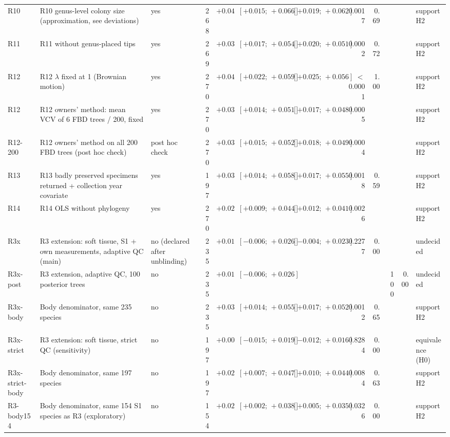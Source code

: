 \begin{table}
\begin{tabular}{@{}l>{\raggedright\arraybackslash}p{9.0cm}>{\raggedright\arraybackslash}p{1.9cm}rrccrrrrl@{}}
R10 & R10 genus-level colony size (approximation, see deviations) & yes & 268 & $+0.041$ & $[+0.015;\,+0.066]$ & $[+0.019;\,+0.062]$ & 0.0017 & 0.69 &  &  & support H2 \\
R11 & R11 without genus-placed tips & yes & 269 & $+0.035$ & $[+0.017;\,+0.054]$ & $[+0.020;\,+0.051]$ & 0.0002 & 0.72 &  &  & support H2 \\
R12 & R12 $\lambda$ fixed at 1 (Brownian motion) & yes & 270 & $+0.040$ & $[+0.022;\,+0.059]$ & $[+0.025;\,+0.056]$ & $<$0.0001 & 1.00 &  &  & support H2 \\
R12 & R12 owners' method: mean VCV of 6 FBD trees / 200, fixed & yes & 270 & $+0.033$ & $[+0.014;\,+0.051]$ & $[+0.017;\,+0.048]$ & 0.0005 &  &  &  & support H2 \\
R12-200 & R12 owners' method on all 200 FBD trees (post hoc check) & post hoc check & 270 & $+0.033$ & $[+0.015;\,+0.052]$ & $[+0.018;\,+0.049]$ & 0.0004 &  &  &  & support H2 \\
R13 & R13 badly preserved specimens returned + collection year covariate & yes & 197 & $+0.036$ & $[+0.014;\,+0.058]$ & $[+0.017;\,+0.055]$ & 0.0018 & 0.59 &  &  & support H2 \\
R14 & R14 OLS without phylogeny & yes & 270 & $+0.027$ & $[+0.009;\,+0.044]$ & $[+0.012;\,+0.041]$ & 0.0026 &  &  &  & support H2 \\
\midrule
R3x & R3 extension: soft tissue, S1 + own measurements, adaptive QC (main) & no (declared after unblinding) & 235 & $+0.010$ & $[-0.006;\,+0.026]$ & $[-0.004;\,+0.023]$ & 0.2277 & 0.00 &  &  & undecided \\
R3x-post & R3 extension, adaptive QC, 100 posterior trees & no & 235 & $+0.010$ & $[-0.006;\,+0.026]$ &  &  &  & 100 & 0.00 & undecided \\
R3x-body & Body denominator, same 235 species & no & 235 & $+0.034$ & $[+0.014;\,+0.055]$ & $[+0.017;\,+0.052]$ & 0.0012 & 0.65 &  &  & support H2 \\
R3x-strict & R3 extension: soft tissue, strict QC (sensitivity) & no & 197 & $+0.002$ & $[-0.015;\,+0.019]$ & $[-0.012;\,+0.016]$ & 0.8284 & 0.00 &  &  & equivalence (H0) \\
R3x-strict-body & Body denominator, same 197 species & no & 197 & $+0.027$ & $[+0.007;\,+0.047]$ & $[+0.010;\,+0.044]$ & 0.0084 & 0.63 &  &  & support H2 \\
R3-body154 & Body denominator, same 154 S1 species as R3 (exploratory) & no & 154 & $+0.020$ & $[+0.002;\,+0.038]$ & $[+0.005;\,+0.035]$ & 0.0326 & 0.00 &  &  & support H2 \\

\end{tabular}
\end{table}
